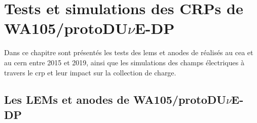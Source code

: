 \chapter{Tests et simulations des CRPs de WA105/\texorpdfstring{protoDU$\nu$E}{protoDUNE}-DP}\label{chap::4}
    
  Dans ce chapitre sont présentés les tests des \glspl{lem} et anodes de \protodp{} réalisés au \gls{cea} et au \gls{cern} entre 2015 et 2019, ainsi que les simulations des champs électriques à travers le \gls{crp} et leur impact sur la collection de charge.
    
  \section{Les LEMs et anodes de WA105/\texorpdfstring{protoDU$\nu$E}{protoDUNE}-DP}
%        
%        
